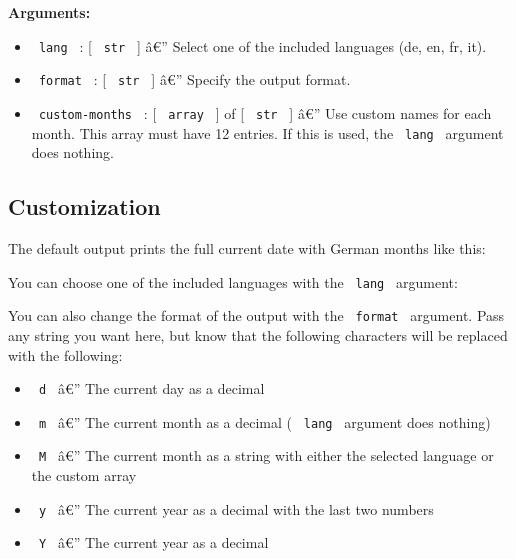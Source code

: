\textbf{Arguments:}

\begin{itemize}
\tightlist
\item
  \texttt{\ lang\ } : {[} \texttt{\ str\ } {]} â€'' Select one of the
  included languages (de, en, fr, it).
\item
  \texttt{\ format\ } : {[} \texttt{\ str\ } {]} â€'' Specify the output
  format.
\item
  \texttt{\ custom-months\ } : {[} \texttt{\ array\ } {]} of {[}
  \texttt{\ str\ } {]} â€'' Use custom names for each month. This array
  must have 12 entries. If this is used, the \texttt{\ lang\ } argument
  does nothing.
\end{itemize}

\subsection{Customization}\label{customization}

The default output prints the full current date with German months like
this:

\begin{Shaded}
\begin{Highlighting}[]
\end{Highlighting}
\end{Shaded}

You can choose one of the included languages with the \texttt{\ lang\ }
argument:

\begin{Shaded}
\begin{Highlighting}[]
\end{Highlighting}
\end{Shaded}

You can also change the format of the output with the
\texttt{\ format\ } argument. Pass any string you want here, but know
that the following characters will be replaced with the following:

\begin{itemize}
\tightlist
\item
  \texttt{\ d\ } â€'' The current day as a decimal
\item
  \texttt{\ m\ } â€'' The current month as a decimal ( \texttt{\ lang\ }
  argument does nothing)
\item
  \texttt{\ M\ } â€'' The current month as a string with either the
  selected language or the custom array
\item
  \texttt{\ y\ } â€'' The current year as a decimal with the last two
  numbers
\item
  \texttt{\ Y\ } â€'' The current year as a decimal
\end{itemize}

